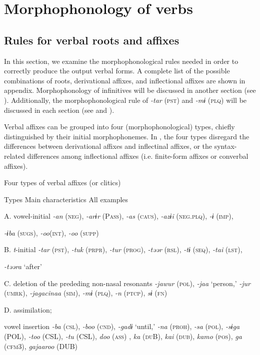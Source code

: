 \section{Morphophonology of verbs}
\label{bkm:Ref356245430}\subsection{Rules for verbal roots and affixes}

In this section, we examine the morphophonological rules needed in order to correctly produce the output verbal forms. A complete list of the possible combinations of roots, derivational affixes, and inflectional affixes are shown in appendix. Morphophonology of infinitives will be discussed in another section (see ). Additionally, the morphophonological rule of \textit{{}-tar} (\textsc{pst}) and \textit{{}-mɨ} (\textsc{plq}) will be discussed in each section (see  and ).

  Verbal affixes can be grouped into four (morphophonological) types, chiefly distinguished by their initial morphophonemes. In , the four types disregard the differences between derivational affixes and inflectinal affixes, or the syntax-related differences among inflectional affixes (i.e. finite-form affixes or converbal affixes).

\begin{table}
\caption{\label{tab:key:56}Four types of verbal affixes (or clitics)}

Types  Main characteristics  All examples

A.  vowel-initial  \textit{{}-an} (\textsc{neg}), \textit{{}-arɨr} (P\textsc{ass}), \textit{{}-as} (\textsc{caus}), \textit{-azɨi} (\textsc{neg}.\textsc{plq}), \textit{{}-ɨ} (\textsc{imp}),

\textit{{}-ɨba} (\textsc{sugs}), \textit{-oo}(\textsc{int}), \textit{-oo} (\textsc{supp})

B.  \textit{t}{}-initial  \textit{{}-tar} (\textsc{pst}), \textit{{}-tuk} (\textsc{prpr}), \textit{{}-tur} (\textsc{prog}), \textit{{}-təər} (\textsc{rsl}), \textit{{}-tɨ} (\textsc{seq}), \textit{{}-tai} (\textsc{lst}),

\textit{{}-təəra} ‘after’

C.  deletion of the prededing non-nasal resonants  \textit{{}-jawur} (\textsc{pol}), \textit{{}-jaa} ‘person,’ \textit{{}-jur} (\textsc{umrk}), \textit{{}-jagacinaa} (\textsc{sim}), \textit{{}-mɨ} (\textsc{plq}), \textit{{}-n} (\textsc{ptcp}), \textit{sɨ} (\textsc{fn})

D.  assimilation;

vowel insertion  \textit{{}-ba} (\textsc{csl}), \textit{{}-boo} (\textsc{cnd}), \textit{{}-gadɨ} ‘until,’ \textit{{}-na} (\textsc{proh}), \textit{{}-sa} (\textsc{pol}), \textit{{}-sɨga} (POL), \textit{{}-too} (CSL), \textit{{}-tu} (CSL), \textit{doo} (\textsc{ass}) , \textit{ka} (\textsc{du}B), \textit{kai} (\textsc{dub}), \textit{kamo} (\textsc{pos}), \textit{ga} (\textsc{cfm}3), \textit{gajaaroo} (DUB)
\end{table}

